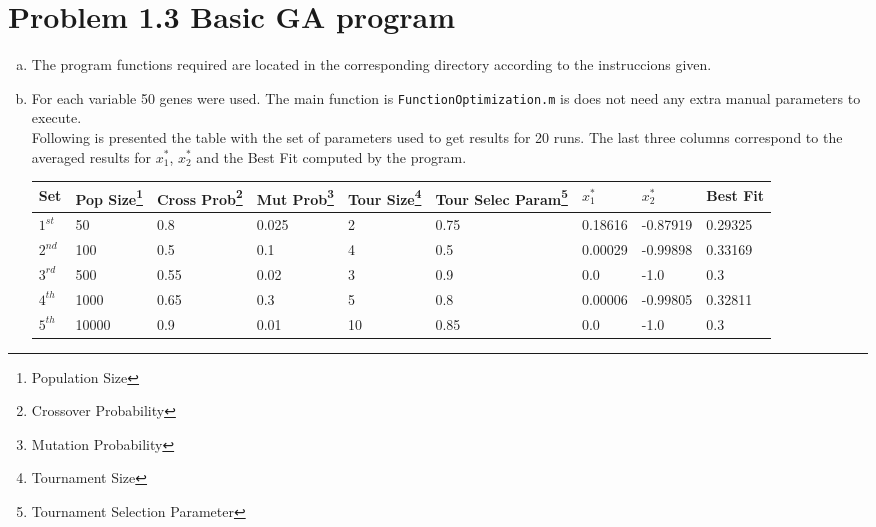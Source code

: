 \documentclass[18pt,a4paper]{article}
\begin{document}
\newpage

\section{Problem 1.3 Basic GA program}
	\begin{enumerate}[a)]

		\item The program functions required are located in the corresponding directory according to the instruccions given.
		
		\item For each variable 50 genes were used. The main function is {\tt FunctionOptimization.m} is does not need any extra manual parameters to execute.\\ Following is presented the table with the set of parameters used to get results for 20 runs. The last three columns correspond to the averaged results for $x_1^{*}$, $x_2^{*}$ and the Best Fit computed by the program.
			\begin{table}[h]
				\centering
				\begin{tabular}{l l l l l l l l l}\hline
				Set & Pop Size\footnote{Population Size} & Cross Prob\footnote{Crossover Probability} & Mut Prob\footnote{Mutation Probability} & Tour Size\footnote{Tournament Size} & Tour Selec Param\footnote{Tournament Selection Parameter} & $x_1^{*}$ & $x_2^{*}$ & Best Fit  \\ \hline
				$1^{st}$     & 50             & 0.8                  & 0.025                & 2               & 0.75                            & 0.18616 & -0.87919 & 0.29325 \\
				$2^{nd}$     & 100            & 0.5                  & 0.1                  & 4               & 0.5                             & 0.00029 & -0.99898 & 0.33169  \\
				$3^{rd}$     & 500            & 0.55                 & 0.02                 & 3               & 0.9                             & 0.0      & -1.0    & 0.3       \\
				$4^{th}$     & 1000           & 0.65                 & 0.3                  & 5               & 0.8                             & 0.00006 & -0.99805 & 0.32811 \\
				$5^{th}$     & 10000          & 0.9                  & 0.01                 & 10              & 0.85                            & 0.0      & -1.0      & 0.3\\ \hline      
				\end{tabular}
			\end{table}
		

\end{enumerate}
\end{document}
